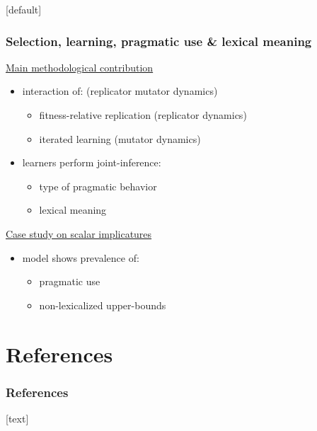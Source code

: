 \documentclass{beamer} %
\makeatletter
\newenvironment{withoutheadline}{
        \setbeamertemplate{headline}[default]
        \def\beamer@entrycode{\vspace*{-\headheight}}
    }{}
\makeatother
\begin{document}
\begin{withoutheadline}
\begin{frame}

  \frametitle{Selection, learning, pragmatic use \& lexical meaning}

  	\underline{Main methodological contribution}

	\begin{itemize}
        \item interaction of: \hfill (replicator mutator dynamics)
          \begin{itemize}
          \item fitness-relative replication \hfill (replicator dynamics)
          \item iterated learning \hfill (mutator dynamics)
          \end{itemize}
        \item learners perform joint-inference:
          \begin{itemize}
          \item type of pragmatic behavior
          \item lexical meaning
          \end{itemize}

	\end{itemize}

        \medskip

        \underline{Case study on scalar implicatures}

        \begin{itemize}
        \item model shows prevalence of:
          \begin{itemize}
          \item pragmatic use
          \item non-lexicalized upper-bounds
          \end{itemize}
        \end{itemize}
\end{frame}


\section[References]{References}
\begin{frame}[allowframebreaks]\frametitle{References}
\tiny
{}[text]

\end{frame}
\end{withoutheadline}
\end{document}
